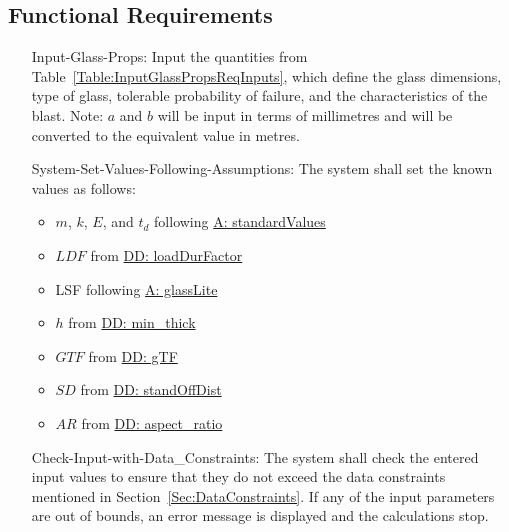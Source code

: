 \documentclass[12pt]{article}
\begin{document}
\subsection{Functional Requirements}
\label{Sec:FRs}
\begin{itemize}
\item[Input-Glass-Props:\phantomsection\label{inputGlassProps}]Input the quantities from Table~\ref{Table:InputGlassPropsReqInputs}, which define the glass dimensions, type of glass, tolerable probability of failure, and the characteristics of the blast. Note: $a$ and $b$ will be input in terms of millimetres and will be converted to the equivalent value in metres.
\item[System-Set-Values-Following-Assumptions:\phantomsection\label{sysSetValsFollowingAssumps}]The system shall set the known values as follows:
                                                                                                \begin{itemize}
                                                                                                \item{$m$, $k$, $E$, and ${t_{d}}$ following \hyperref[A:standardValues]{A: standardValues}}
                                                                                                \item{$LDF$ from \hyperref[DD:loadDurFactor]{DD: loadDurFactor}}
                                                                                                \item{LSF following \hyperref[A:glassLite]{A: glassLite}}
                                                                                                \item{$h$ from \hyperref[DD:min.thick]{DD: min\_thick}}
                                                                                                \item{$GTF$ from \hyperref[DD:gTF]{DD: gTF}}
                                                                                                \item{$SD$ from \hyperref[DD:standOffDist]{DD: standOffDist}}
                                                                                                \item{$AR$ from \hyperref[DD:aspect.ratio]{DD: aspect\_ratio}}
                                                                                                \end{itemize}
\item[Check-Input-with-Data\_Constraints:\phantomsection\label{checkInputWithDataCons}]The system shall check the entered input values to ensure that they do not exceed the data constraints mentioned in Section~\ref{Sec:DataConstraints}. If any of the input parameters are out of bounds, an error message is displayed and the calculations stop.

\end{itemize}
\end{document}
